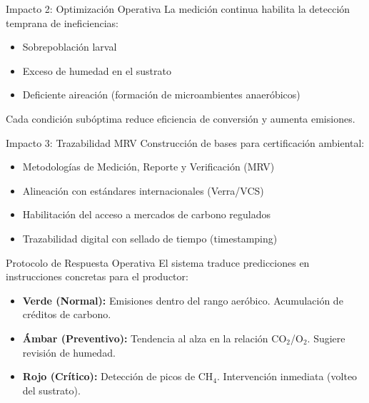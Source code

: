 \documentclass[aspectratio=169, 11pt]{beamer}
\begin{document}
\begin{frame}{Impacto 2: Optimización Operativa}
    La medición continua habilita la detección temprana de ineficiencias:
    \vspace{0.3cm}
    \begin{itemize}
        \item Sobrepoblación larval
        \item Exceso de humedad en el sustrato
        \item Deficiente aireación (formación de microambientes anaeróbicos)
    \end{itemize}
    \vspace{0.3cm}
    Cada condición subóptima reduce eficiencia de conversión y aumenta emisiones.
\end{frame}

\begin{frame}{Impacto 3: Trazabilidad MRV}
    Construcción de bases para certificación ambiental:
    \vspace{0.3cm}
    \begin{itemize}
        \item Metodologías de Medición, Reporte y Verificación (MRV)
        \item Alineación con estándares internacionales (Verra/VCS)
        \item Habilitación del acceso a mercados de carbono regulados
        \item Trazabilidad digital con sellado de tiempo (timestamping)
    \end{itemize}
\end{frame}

\begin{frame}{Protocolo de Respuesta Operativa}
    El sistema traduce predicciones en instrucciones concretas para el productor:
    \vspace{0.3cm}
    \begin{itemize}
        \item \textcolor{verdeOK}{\textbf{Verde (Normal):}} Emisiones dentro del rango aeróbico. Acumulación de créditos de carbono.
        \item \textcolor{naranjaAlerta}{\textbf{Ámbar (Preventivo):}} Tendencia al alza en la relación CO$_2$/O$_2$. Sugiere revisión de humedad.
        \item \textcolor{rojoAlerta}{\textbf{Rojo (Crítico):}} Detección de picos de CH$_4$. Intervención inmediata (volteo del sustrato).
    \end{itemize}
\end{frame}
\end{document}
